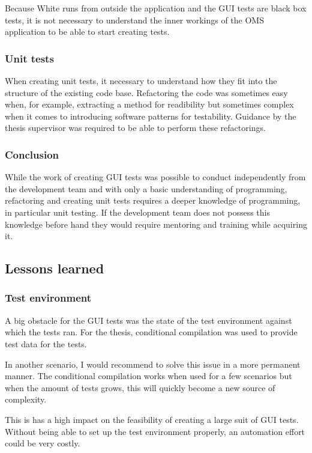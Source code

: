 \documentclass{article}
\begin{document}
			Because White runs from outside the application and the GUI tests are black box tests, it is not necessary to understand the inner workings of the OMS application to be able to start creating tests.

			\subsubsection{Unit tests}
			When creating unit tests, it necessary to understand how they fit into the structure of the existing code base. Refactoring the code was sometimes easy when, for example, extracting a method for readibility but sometimes complex when it comes to introducing software patterns for testability. Guidance by the thesis supervisor was required to be able to perform these refactorings.

			\subsubsection{Conclusion}
			While the work of creating GUI tests was possible to conduct independently from the development team and with only a basic understanding of programming, refactoring and creating unit tests requires a deeper knowledge of programming, in particular unit testing. If the development team does not possess this knowledge before hand they would require mentoring and training while acquiring it.

		\subsection{Lessons learned}
			\subsubsection{Test environment}
			A big obstacle for the GUI tests was the state of the test environment against which the tests ran. For the thesis, conditional compilation was used to provide test data for the tests. 

			In another scenario, I would recommend to solve this issue in a more permanent manner. The conditional compilation works when used for a few scenarios but when the amount of tests grows, this will quickly become a new source of complexity.

			This is has a high impact on the feasibility of creating a large suit of GUI tests. Without being able to set up the test environment properly, an automation effort could be very costly.
\end{document}
